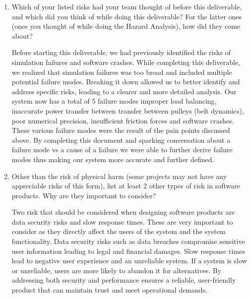 \documentclass{article}
\begin{document}
\begin{enumerate}
    \item Which of your listed risks had your team thought of before this
    deliverable, and which did you think of while doing this deliverable? For
    the latter ones (ones you thought of while doing the Hazard Analysis), how
    did they come about?

    Before starting this deliverable, we had previously identified the risks of simulation failures and software crashes. 
    While completing this deliverable, we realized that simulation failures was too broad and included multiple potential failure modes. 
    Breaking it down allowed us to better identify and address specific risks, leading to a clearer and more detailed analysis.  
    Our system now has a total of 5 failure modes improper load balancing, inaccurate power transfer between transfer between pulleys (belt dynamics), poor numerical precision, insufficient friction forces and software crashes. 
    These various failure modes were the result of the pain points discussed above. 
    By completing this document and sparking conversation about a failure mode vs a cause of a failure we were able to further derive failure modes thus making our system more accurate and further defined. 

    \item Other than the risk of physical harm (some projects may not have any
    appreciable risks of this form), list at least 2 other types of risk in
    software products. Why are they important to consider?

    Two risk that should be considered when designing software products are data security risks and slow response times.  
    These are very important to consider as they directly affect the users of the system and the system functionality.  
    Data security risks such as data breaches compromise sensitive user information leading to legal and financial damages. 
    Slow response times lead to negative user experience and an unreliable system. 
    If a system is slow or unreliable, users are more likely to abandon it for alternatives. 
    By addressing both security and performance ensures a reliable, user-friendly product that can maintain trust and meet operational demands.
\end{enumerate}
\end{document}
